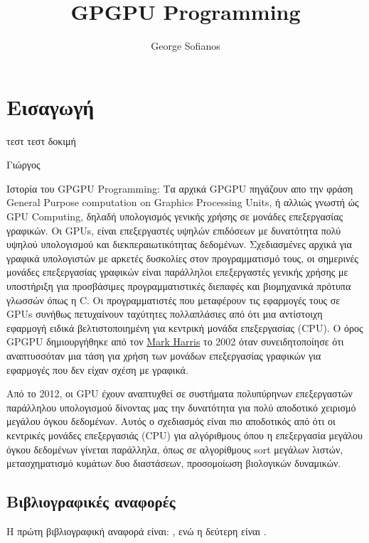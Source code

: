 \documentclass[11pt,a4paper,twoside]{book}
\author{George Sofianos}
\title{GPGPU Programming}
\begin{document}

 
\tableofcontents

\chapter{Εισαγωγή}
\epigraph{τεστ τεστ δοκιμή}{Γιώργος}
Ιστορία του GPGPU Programming:
Τα αρχικά GPGPU πηγάζουν απο την φράση General Purpose computation on Graphics Processing Units, ή αλλιώς γνωστή ώς GPU Computing, δηλαδή υπολογισμός γενικής χρήσης σε μονάδες επεξεργασίας γραφικών.
Οι GPUs, είναι επεξεργαστές υψηλών επιδόσεων με δυνατότητα πολύ υψηλού υπολογισμού και διεκπεραιωτικότητας δεδομένων. Σχεδιασμένες αρχικά για γραφικά υπολογιστών με αρκετές δυσκολίες στον προγραμματισμό τους, οι σημερινές μονάδες επεξεργασίας γραφικών είναι παράλληλοι επεξεργαστές γενικής χρήσης με υποστήριξη για προσβάσιμες προγραμματιστικές διεπαφές και βιομηχανικά πρότυπα γλωσσών όπως η C. Οι προγραμματιστές που μεταφέρουν τις εφαρμογές τους σε GPUs συνήθως πετυχαίνουν ταχύτητες πολλαπλάσιες από ότι μια αντίστοιχη εφαρμογή ειδικά βελτιστοποιημένη για κεντρική μονάδα επεξεργασίας (CPU).
Ο όρος GPGPU δημιουργήθηκε από τον \href{http://en.wikipedia.org/wiki/Mark_Harris_(programmer)}{Mark Harris} το 2002 όταν συνειδητοποίησε ότι αναπτυσσόταν μια τάση για χρήση των μονάδων επεξεργασίας γραφικών για εφαρμογές που δεν είχαν σχέση με γραφικά. 

Από το 2012, οι GPU έχουν αναπτυχθεί σε συστήματα πολυπύρηνων επεξεργαστών παράλληλου υπολογισμού δίνοντας μας την δυνατότητα για πολύ αποδοτικό χειρισμό μεγάλου όγκου δεδομένων. Αυτός ο σχεδιασμός είναι πιο αποδοτικός από ότι οι κεντρικές μονάδες επεξεργασιάς (CPU) για αλγόριθμους όπου η επεξεργασία μεγάλου όγκου δεδομένων γίνεται παράλληλα, όπως σε αλγορίθμους sort μεγάλων λιστών, μετασχηματισμό κυμάτων δυο διαστάσεων, προσομοίωση βιολογικών δυναμικών.




\section{Βιβλιογραφικές αναφορές}
H πρώτη βιβλιογραφική αναφορά είναι: \parencite{doe}, ενώ η δεύτερη είναι \parencite{papadopoulos}.

\printbibliography[title={Βιβλιογραφία}]
\end{document}
